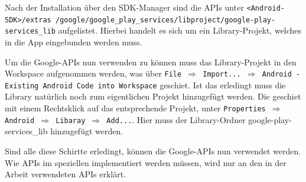 Nach der Installation \"uber den \ac{SDK}-Manager sind die APIs unter \texttt{<Android-SDK>/extras /google/google\_play\_services/libproject/google-play-services\_lib} aufgelistet. Hierbei handelt es sich um ein Library-Projekt, welches in die App eingebunden werden muss.

Um die Google-APIs nun verwenden zu k\"onnen muss das Library-Projekt in den Workspace aufgenommen werden, was \"uber \texttt{File $\Rightarrow$ Import... $\Rightarrow$ Android - Existing Android Code into Workspace} geschiet. Ist das erledingt muss die Library nat\"urlich noch zum eigentlichen Projekt hinzugef\"ugt werden. Die geschiet mit einem Rechtsklick auf das entsprechende Projekt, unter \texttt{Properties $\Rightarrow$ Android $\Rightarrow$ Libaray $\Rightarrow$ Add...}. Hier muss der Library-Ordner google-play-services\_lib hinzugef\"ugt werden.

Sind alle diese Schirtte erledingt, k\"onnen die Google-APIs nun verwendet werden. Wie APIs im speziellen implementiert werden m\"ussen, wird nur an den in der Arbeit verwendeten APIs erkl\"art. \cite{ApiAccess} \cite{GolemHBGoogleServices}